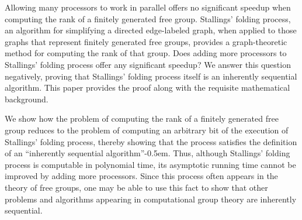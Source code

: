 
Allowing many processors to work in parallel offers no significant speedup when computing the rank of a finitely generated free group.
Stallings' folding process, an algorithm for simplifying a directed edge-labeled graph, when applied to those graphs that represent finitely generated free groups, provides a graph-theoretic method for computing the rank of that group.
Does adding more processors to Stallings' folding process offer any significant speedup?
We answer this question negatively, proving that Stallings' folding process itself is an inherently sequential algorithm.
This paper provides the proof along with the requisite mathematical background.

%
We show how the problem of computing the rank of a finitely generated free group reduces to the problem of computing an arbitrary bit of the execution of Stallings' folding process, thereby showing that the process satisfies the definition of an ``inherently sequential algorithm''\kern-0.5em.
Thus, although Stallings' folding process is computable in polynomial time, its asymptotic running time cannot be improved by adding more processors.
Since this process often appears in the theory of free groups, one may be able to use this fact to show that other problems and algorithms appearing in computational group theory are inherently sequential.
